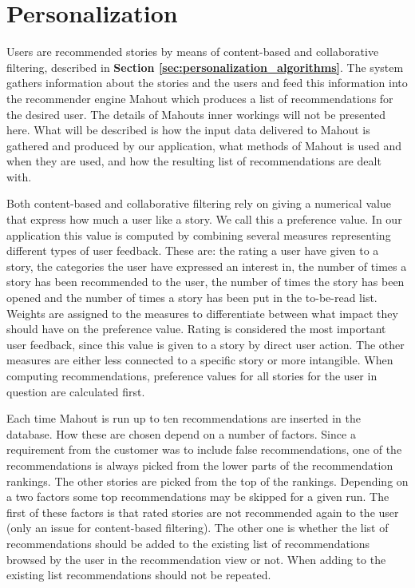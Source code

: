 \section{Personalization}
\label{sec:personalization_how}

Users are recommended stories by means of content-based and collaborative filtering, described in \textbf{Section \ref{sec:personalization_algorithms}}. The system gathers information about the stories and the users and feed this information into the recommender engine Mahout which produces a list of recommendations for the desired user. The details of Mahouts inner workings will not be presented here. What will be described is how the input data delivered to Mahout is gathered and produced by our application, what methods of Mahout is used and when they are used, and how the resulting list of recommendations are dealt with.\newline

Both content-based and collaborative filtering rely on giving a numerical value that express how much a user like a story. We call this a preference value. In our application this value is computed by combining several measures representing different types of user feedback. These are: the rating a user have given to a story, the categories the user have expressed an interest in, the number of times a story has been recommended to the user, the number of times the story has been opened and the number of times a story has been put in the to-be-read list. Weights are assigned to the measures to differentiate between what impact they should have on the preference value. Rating is considered the most important user feedback, since this value is given to a story by direct user action. The other measures are either less connected to a specific story or more intangible. When computing recommendations, preference values for all stories for the user in question are calculated first.\newline

Each time Mahout is run up to ten recommendations are inserted in the database. How these are chosen depend on a number of factors. Since a requirement from the customer was to include false recommendations, one of the recommendations is always picked from the lower parts of the recommendation rankings. The other stories are picked from the top of the rankings. Depending on a two factors some top recommendations may be skipped for a given run. The first of these factors is that rated stories are not recommended again to the user (only an issue for content-based filtering). The other one is whether the list of recommendations should be added to the existing list of recommendations browsed by the user in the recommendation view or not. When adding to the existing list recommendations should not be repeated.\newline

